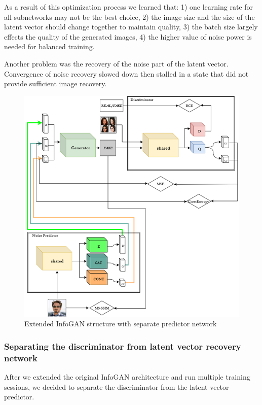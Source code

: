 \documentclass{egpubl}
\begin{document}
As a result of this optimization process we learned that: 1) one learning rate for all subnetworks may not be the best choice, 2) the image size and the size of the latent vector should change together to maintain quality, 3) the batch size largely effects the quality of the generated images, 4) the higher value of noise power is needed for balanced training.

Another problem was the recovery of the noise part of the latent vector. Convergence of noise recovery slowed down then stalled in a state that did not provide sufficient image recovery.

\begin{figure}[!htb]
	\centering
	\includegraphics[width=\linewidth]{pic/2}
	\caption{Extended InfoGAN structure with separate predictor network}
	\label{fig:infogan_noise}
\end{figure}

\subsubsection{Separating the discriminator from latent vector recovery network}

After we extended the original InfoGAN architecture and run multiple training sessions, we decided to separate the discriminator from the latent vector predictor. 
\end{document}
